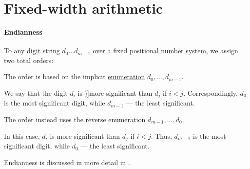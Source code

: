 \section{Fixed-width arithmetic}\label{sec:fixed_width_arithmetic}

\paragraph{Endianness}

\begin{definition}\label{def:endianness}\mimprovised
  To any \hyperref[def:positional_number_system]{digit string} \( d_0 \ldots d_{m-1} \) over a fixed \hyperref[def:positional_number_system]{positional number system}, we assign two total orders:

  \begin{thmenum}
     The  order is based on the implicit \hyperref[def:enumeration]{enumeration} \( d_0, \ldots, d_{m-1} \).

    We say that the digit \( d_i \) is \term[en=more significant (\cite[195]{Knuth1997ArtVol2})]{more significant} than \( d_j \) if \( i < j \). Correspondingly, \( d_0 \) is the most significant digit, while \( d_{m-1} \) --- the least significant.

     The  order instead uses the reverse enumeration \( d_{m-1}, \ldots, d_0 \).

    In this case, \( d_i \) is more significant than \( d_j \) if \( i < j \). Thus, \( d_{m-1} \) is the most significant digit, while \( d_0 \) --- the least significant.
  \end{thmenum}
\end{definition}
\begin{comments}
  \item Endianness is discussed in more detail in .
\end{comments}

